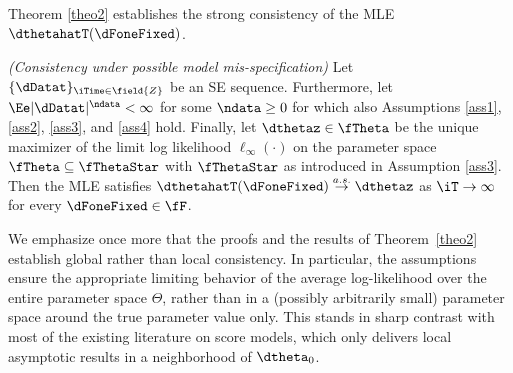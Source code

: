 Theorem \ref{theo2} establishes the strong consistency of the MLE $\dthetahatT(\dFoneFixed)$.

\begin{theo} \label{theo2}
\emph{(Consistency under possible model mis-specification)}
Let $\{\dDatat\}_{\iTime \in \field{Z}}$ be an SE sequence.
Furthermore, let $\Ee|\dDatat|^{\ndata}<\infty$ for some $\ndata\geq 0$ for which also Assumptions \ref{ass1}, \ref{ass2}, \ref{ass3}, and \ref{ass4} hold. 
Finally, let  $\dthetaz \in \fTheta$ be the unique maximizer of the limit log likelihood $\ell_{\infty}(\cdot)$ on the parameter space $\fTheta \subseteq \fThetaStar$ with $\fThetaStar$ as introduced in Assumption \ref{ass3}. Then the MLE satisfies  $\dthetahatT(\dFoneFixed) \stackrel{a.s.}{\to}  \dthetaz$ as $\iT \to \infty$ for every $\dFoneFixed \in \fF$. 
\end{theo}


We emphasize once more that the proofs and the results of Theorem~\ref{theo2} establish global rather than local consistency. In particular, the assumptions ensure the appropriate limiting behavior of the average log-likelihood over the entire parameter space $\Theta$, rather than in a (possibly arbitrarily small) parameter space around the true parameter value only. This stands in sharp contrast with most of the existing literature on score models, which only delivers local asymptotic results in a neighborhood of $\dtheta_{0}$. 

